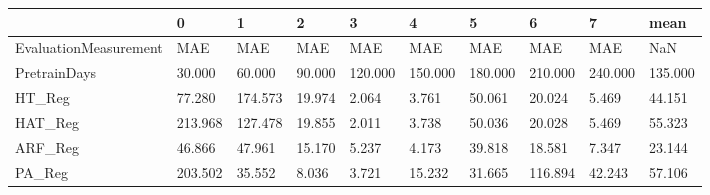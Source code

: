 \begin{tabular}{llllllllll}
\toprule
{} &       0 &       1 &      2 &       3 &       4 &       5 &       6 &       7 &    mean \\
\midrule
EvaluationMeasurement &     MAE &     MAE &    MAE &     MAE &     MAE &     MAE &     MAE &     MAE &     NaN \\
PretrainDays          &  30.000 &  60.000 & 90.000 & 120.000 & 150.000 & 180.000 & 210.000 & 240.000 & 135.000 \\
HT\_Reg                &  77.280 & 174.573 & 19.974 &   2.064 &   3.761 &  50.061 &  20.024 &   5.469 &  44.151 \\
HAT\_Reg               & 213.968 & 127.478 & 19.855 &   2.011 &   3.738 &  50.036 &  20.028 &   5.469 &  55.323 \\
ARF\_Reg               &  46.866 &  47.961 & 15.170 &   5.237 &   4.173 &  39.818 &  18.581 &   7.347 &  23.144 \\
PA\_Reg                & 203.502 &  35.552 &  8.036 &   3.721 &  15.232 &  31.665 & 116.894 &  42.243 &  57.106 \\
\bottomrule
\end{tabular}
